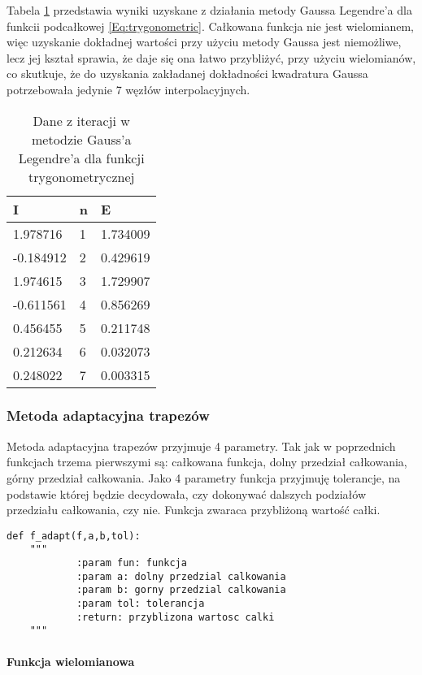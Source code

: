 \documentclass[12pt,twoside]{article}
\begin{document}
Tabela \ref{tabela4.2} przedstawia wyniki uzyskane z działania metody Gaussa Legendre'a dla funkcii podcałkowej \eqref{Eq:trygonometric}. Całkowana funkcja nie jest wielomianem, więc uzyskanie dokładnej wartości przy użyciu metody Gaussa jest niemożliwe, lecz jej kształ sprawia, że daje się ona łatwo przybliżyć, przy użyciu wielomianów, co skutkuje, że do uzyskania zakładanej dokładności kwadratura Gaussa potrzebowała jedynie 7 węzłów interpolacyjnych.

\begin{table}[H]
\centering
\caption{Dane z iteracji w metodzie Gauss'a Legendre'a dla funkcji trygonometrycznej}
\label{tabela4.2}
\begin{tabular}{lll}
\toprule
I &  n &      E \\
\midrule
1.978716 &       1 &  1.734009 \\
-0.184912 &       2 & 0.429619 \\
1.974615 &       3 &  1.729907 \\
-0.611561 &       4 & 0.856269 \\
0.456455 &       5 &  0.211748 \\
0.212634 &       6 & 0.032073 \\
0.248022 &       7 &  0.003315 \\
\bottomrule
\end{tabular}
\end{table}

\subsubsection{Metoda adaptacyjna trapezów}

Metoda adaptacyjna trapezów przyjmuje 4 parametry. Tak jak w poprzednich funkcjach trzema pierwszymi są: całkowana funkcja, dolny przedział całkowania, górny przedział całkowania. Jako 4 parametry funkcja przyjmuję tolerancje, na podstawie której będzie decydowała, czy dokonywać dalszych podziałów przedziału całkowania, czy nie. Funkcja zwaraca przybliżoną wartość całki.
\begin{lstlisting}[caption={Kod w języku python implementujący adaptacyjną metodę trapezów}]
def f_adapt(f,a,b,tol):
    """
    		:param fun: funkcja
            :param a: dolny przedzial calkowania
            :param b: gorny przedzial calkowania
            :param tol: tolerancja
            :return: przyblizona wartosc calki
    """
\end{lstlisting}
\label{Listing 10}

\paragraph{Funkcja wielomianowa}\mbox{} \\
\end{document}
